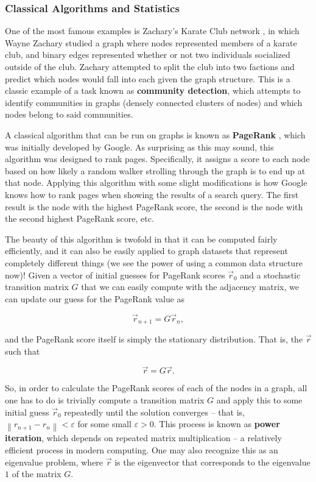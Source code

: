 \documentclass{article}
\theoremstyle{definition}
\newcommand{\norm}[1]{\left\lVert#1\right\rVert}
\begin{document}
\subsubsection{Classical Algorithms and Statistics}

One of the most famous examples is Zachary's Karate Club network \cite{zacharyKarateClub}, in which Wayne Zachary studied a graph where nodes represented members of a karate club, and binary edges represented whether or not two individuals socialized outside of the club. Zachary attempted to split the club into two factions and predict which nodes would fall into each given the graph structure. This is a classic example of a task known as \textbf{community detection}, which attempts to identify communities in graphs (densely connected clusters of nodes) and which nodes belong to said communities.

A classical algorithm that can be run on graphs is known as \textbf{PageRank} \cite{PageRank}, which was initially developed by Google. As surprising as this may sound, this algorithm was designed to rank pages. Specifically, it assigns a score to each node based on how likely a random walker strolling through the graph is to end up at that node. Applying this algorithm with some slight modifications is how Google knows how to rank pages when showing the results of a search query. The first result is the node with the highest PageRank score, the second is the node with the second highest PageRank score, etc. 

The beauty of this algorithm is twofold in that it can be computed fairly efficiently, and it can also be easily applied to graph datasets that represent completely different things (we see the power of using a common data structure now)! Given a vector of initial guesses for PageRank scores $\Vec{r}_0$ and a stochastic transition matrix $G$ that we can easily compute with the adjacency matrix, we can update our guess for the PageRank value as

\[
\Vec{r}_{n+1} = G \Vec{r}_n,
\]

and the PageRank score itself is simply the stationary distribution. That is, the $\Vec{r}$ such that

\[
\Vec{r} = G \Vec{r}.
\]

So, in order to calculate the PageRank scores of each of the nodes in a graph, all one has to do is trivially compute a transition matrix $G$ and apply this to some initial guess $\Vec{r}_0$ repeatedly until the solution converges -- that is, $\norm{r_{n+1} - r_{n}} < \varepsilon$ for some small $\varepsilon > 0$. This process is known as \textbf{power iteration}, which depends on repeated matrix multiplication -- a relatively efficient process in modern computing. One may also recognize this as an eigenvalue problem, where $\Vec{r}$ is the eigenvector that corresponds to the eigenvalue $1$ of the matrix $G$.
\end{document}
